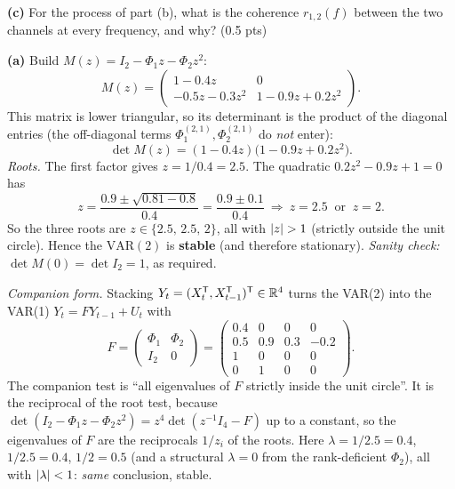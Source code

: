 \documentclass[11pt]{article}
\begin{document}
\textbf{(c)} For the process of part (b), what is the coherence $r_{1,2}(f)$ between the two channels at every frequency, and why? \hfill(0.5 pts)
\statementend

\textbf{(a)} Build $M(z)=I_2-\Phi_1 z-\Phi_2 z^2$:
\[
M(z)=\begin{pmatrix}
1-0.4z & 0\\[2pt]
-0.5z-0.3z^2 & 1-0.9z+0.2z^2
\end{pmatrix}.
\]
This matrix is lower triangular, so its determinant is the product of the diagonal entries (the off-diagonal terms $\Phi_1^{(2,1)},\Phi_2^{(2,1)}$ do \emph{not} enter):
\[
\det M(z)=(1-0.4z)\bigl(1-0.9z+0.2z^2\bigr).
\]
\emph{Roots.} The first factor gives $z=1/0.4=2.5$. The quadratic $0.2z^2-0.9z+1=0$ has
\[
z=\frac{0.9\pm\sqrt{0.81-0.8}}{0.4}=\frac{0.9\pm0.1}{0.4}
\ \Longrightarrow\ z=2.5\ \text{ or }\ z=2 .
\]
So the three roots are $z\in\{2.5,\,2.5,\,2\}$, all with $\left\lvert z \right\rvert>1$ (strictly outside the unit circle). Hence the $\mathrm{VAR}(2)$ is \textbf{stable} (and therefore stationary). \emph{Sanity check:} $\det M(0)=\det I_2=1$, as required.

\emph{Companion form.} Stacking $Y_t=(X_t^{\mathsf{T}},X_{t-1}^{\mathsf{T}})^{\mathsf{T}}\in\mathbb{R}^4$ turns the VAR(2) into the VAR(1) $Y_t=FY_{t-1}+U_t$ with
\[
F=\begin{pmatrix}\Phi_1 & \Phi_2\\ I_2 & 0\end{pmatrix}
=\begin{pmatrix}
0.4 & 0 & 0 & 0\\
0.5 & 0.9 & 0.3 & -0.2\\
1 & 0 & 0 & 0\\
0 & 1 & 0 & 0
\end{pmatrix}.
\]
The companion test is ``all eigenvalues of $F$ strictly inside the unit circle''. It is the reciprocal of the root test, because $\det(I_2-\Phi_1 z-\Phi_2 z^2)=z^{4}\det(z^{-1}I_4-F)$ up to a constant, so the eigenvalues of $F$ are the reciprocals $1/z_i$ of the roots. Here $\lambda=1/2.5=0.4$, $1/2.5=0.4$, $1/2=0.5$ (and a structural $\lambda=0$ from the rank-deficient $\Phi_2$), all with $\left\lvert \lambda \right\rvert<1$: \emph{same} conclusion, stable.
\end{document}
